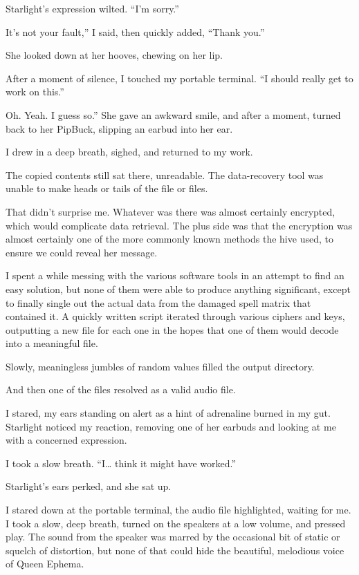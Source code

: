 Starlight’s expression wilted. “I’m sorry.”

\leavevmode{}It’s not your fault,” I said, then quickly added, “Thank you.”

She looked down at her hooves, chewing on her lip.

After a moment of silence, I touched my portable terminal. “I should really get to work on this.”

\leavevmode{}Oh. Yeah. I guess so.” She gave an awkward smile, and after a moment, turned back to her PipBuck, slipping an earbud into her ear.

I drew in a deep breath, sighed, and returned to my work.

The copied contents still sat there, unreadable. The data-recovery tool was unable to make heads or tails of the file or files.

That didn’t surprise me. Whatever was there was almost certainly encrypted, which would complicate data retrieval. The plus side was that the encryption was almost certainly one of the more commonly known methods the hive used, to ensure we could reveal her message.

I spent a while messing with the various software tools in an attempt to find an easy solution, but none of them were able to produce anything significant, except to finally single out the actual data from the damaged spell matrix that contained it. A quickly written script iterated through various ciphers and keys, outputting a new file for each one in the hopes that one of them would decode into a meaningful file.

Slowly, meaningless jumbles of random values filled the output directory.

And then one of the files resolved as a valid audio file.

I stared, my ears standing on alert as a hint of adrenaline burned in my gut. Starlight noticed my reaction, removing one of her earbuds and looking at me with a concerned expression.

I took a slow breath. “I… think it might have worked.”

Starlight’s ears perked, and she sat up.

I stared down at the portable terminal, the audio file highlighted, waiting for me. I took a slow, deep breath, turned on the speakers at a low volume, and pressed play. The sound from the speaker was marred by the occasional bit of static or squelch of distortion, but none of that could hide the beautiful, melodious voice of Queen Ephema.

